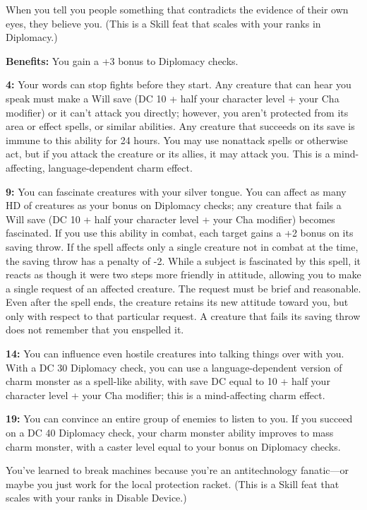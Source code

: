 
When you tell you people something that contradicts the evidence of their own eyes, they believe you. (This is a Skill feat that scales with your ranks in Diplomacy.)

\textbf{Benefits:} You gain a +3 bonus to Diplomacy checks.

\textbf{4:} Your words can stop fights before they start. Any creature that can hear you speak must make a Will save (DC 10 + half your character level + your Cha modifier) or it can't attack you directly; however, you aren't protected from its area or effect spells, or similar abilities. Any creature that succeeds on its save is immune to this ability for 24 hours. You may use nonattack spells or otherwise act, but if you attack the creature or its allies, it may attack you. This is a mind-affecting, language-dependent charm effect.

\textbf{9:} You can fascinate creatures with your silver tongue. You can affect as many HD of creatures as your bonus on Diplomacy checks; any creature that fails a Will save (DC 10 + half your character level + your Cha modifier) becomes fascinated. If you use this ability in combat, each target gains a +2 bonus on its saving throw. If the spell affects only a single creature not in combat at the time, the saving throw has a penalty of -2. While a subject is fascinated by this spell, it reacts as though it were two steps more friendly in attitude, allowing you to make a single request of an affected creature. The request must be brief and reasonable. Even after the spell ends, the creature retains its new attitude toward you, but only with respect to that particular request. A creature that fails its saving throw does not remember that you enspelled it. 

\textbf{14:} You can influence even hostile creatures into talking things over with you. With a DC 30 Diplomacy check, you can use a language-dependent version of charm monster as a spell-like ability, with save DC equal to 10 + half your character level + your Cha modifier; this is a mind-affecting charm effect.

\textbf{19:} You can convince an entire group of enemies to listen to you. If you succeed on a DC 40 Diplomacy check, your charm monster ability improves to mass charm monster, with a caster level equal to your bonus on Diplomacy checks.

You've learned to break machines because you're an antitechnology fanatic—or maybe you just work for the local protection racket. (This is a Skill feat that scales with your ranks in Disable Device.)

